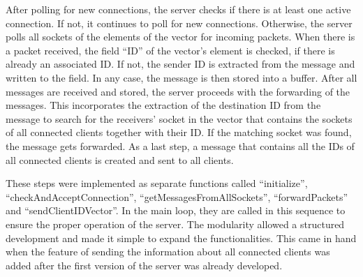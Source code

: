 \par
\medskip
After polling for new connections, the server checks if there is at least one active connection.
If not, it continues to poll for new connections. Otherwise, the server polls all sockets of the
elements of the vector for incoming packets. When there is a packet received, the field “ID” of the
vector’s element is checked, if there is already an associated ID. If not, the sender ID is extracted
from the message and written to the field. In any case, the message is then stored into a buffer. After
all messages are received and stored, the server proceeds with the forwarding of the messages. This
incorporates the extraction of the destination ID from the message to search for the receivers’ socket
in the vector that contains the sockets of all connected clients together with their ID. If the matching
socket was found, the message gets forwarded. As a last step, a message that contains all the IDs of all
connected clients is created and sent to all clients.

\par
\medskip
These steps were implemented as separate functions called “initialize”, “checkAndAcceptConnection”,
“getMessagesFromAllSockets”, “forwardPackets” and “sendClientIDVector”. In the main loop, they are
called in this sequence to ensure the proper operation of the server. The modularity allowed a
structured development and made it simple to expand the functionalities. This came in hand when the
feature of sending the information about all connected clients was added after the first version of the
server was already developed.

